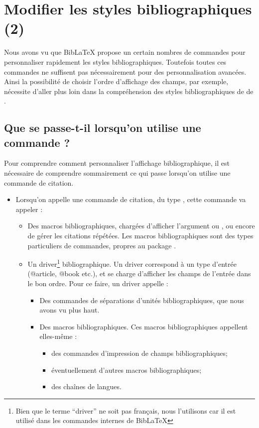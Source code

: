 \chapter{Modifier les styles bibliographiques (2)}

\begin{prealable}
	Nous avons vu que BibLaTeX propose un certain nombres de commandes pour personnaliser rapidement les styles bibliographiques. Toutefois toutes ces commandes ne suffisent pas nécessairement pour des personnalisation avancées. 
	Ainsi la possibilité de choisir l'ordre d'affichage des champs, par exemple, nécessite d'aller plus loin dans la compréhension des styles bibliographiques de de .
\end{prealable}



\section{Que se passe-t-il lorsqu'on utilise une commande  ?}

Pour comprendre comment personnaliser l'affichage bibliographique, il est nécessaire de comprendre sommairement ce qui passe lorsqu'on utilise une commande de citation. 

\begin{itemize}
\item Lorsqu'on appelle une commande de citation, du type , cette commande va appeler :
	\begin{itemize}
		\item Des macros bibliographiques, chargées d'afficher l'argument  ou , ou encore de gérer les citations répétées. Les macros bibliographiques sont des types particuliers de commandes, propres au package . 
		\item Un driver\footnote{Bien que le terme \enquote{driver} ne soit pas français, nous l'utilisons car il est utilisé dans les commandes internes de BibLaTeX} bibliographique. Un driver correspond à un type d'entrée (@article, @book etc.), et se charge d'afficher les champs de l'entrée dans le bon ordre. Pour ce faire, un driver appelle :
		\begin{itemize}
			\item Des commandes de séparations d'unités bibliographiques, que nous avons vu plus haut.
			\item Des macros bibliographiques. Ces macros bibliographiques appellent elles-même :
			\begin{itemize}
				\item des commandes d'impression de champs bibliographiques;
				\item éventuellement d'autres macros bibliographiques;
				\item des chaînes de langues.
			\end{itemize}
		\end{itemize}
		
	\end{itemize}
\end{itemize}

